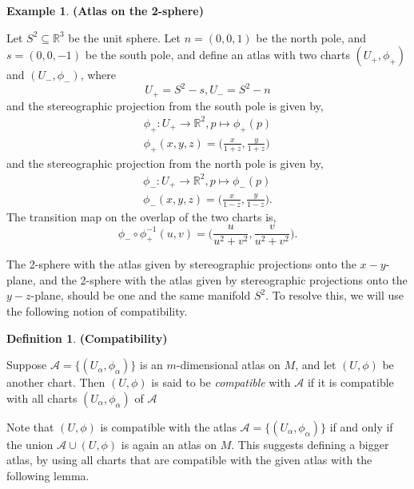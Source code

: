 \documentclass{article}
\theoremstyle{definition}
\newtheorem{defn}[theorem]{Definition}
\newtheorem{example}[theorem]{Example}
\newenvironment{definition}
  {\vspace{8pt}\begin{mdframed}[backgroundcolor=blueish,innertopmargin=4]\begin{defn}}
  {\end{defn}\end{mdframed}\vspace{4pt}}
\begin{document}
\begin{example} \textbf{(Atlas on the 2-sphere)}

Let $S^2 \subseteq \mathbb R^3$ be the unit sphere. Let $n = (0,0,1)$ be the north pole, and $s =(0,0,-1)$ be the south pole, and define an atlas with two charts $(U_+,\phi_+)$ and $(U_-,\phi_-)$, where
\[
U_+ = S^2 - {s}, U_- = S^2 - {n}
\]
and the stereographic projection from the south pole is given by,
\begin{align*}
    \phi_+ : U_+ \rightarrow \mathbb R^2, p \mapsto \phi_+(p)\\
    \phi_+(x, y,z) = \bigg( \frac{x}{1+z},\frac{y}{1+z} \bigg)
\end{align*}
and the stereographic projection from the north pole is given by,
\begin{align*}
    \phi_- : U_+ \rightarrow \mathbb R^2, p \mapsto \phi_-(p)\\
    \phi_-(x, y,z) = \bigg( \frac{x}{1-z},\frac{y}{1-z} \bigg).
\end{align*}
The transition map on the overlap of the two charts is,
\begin{equation*}
    \phi_- \circ \phi_+^{-1} (u,v) =  \bigg( \frac{u}{u^2 + v^2}, \frac{v}{u^2 + v^2} \bigg).
\end{equation*}

\end{example}



The 2-sphere with the atlas given by stereographic projections onto the $x-y$-plane, and the 2-sphere with the atlas given by stereographic projections onto the $y-z$-plane, should be one and the same manifold $S^2$. To resolve this, we will use the following notion of compatibility.

\begin{definition} \textbf{(Compatibility)}

Suppose $\mathscr{A} =  \{(U_\alpha, \phi_\alpha) \}$ is an $m$-dimensional atlas on $M$, and let $(U,\phi)$ be another chart. Then $(U,\phi)$ is said to be \textit{compatible} with $\mathscr{A}$ if it is compatible with all charts $(U_\alpha, \phi_\alpha)$ of $\mathscr{A}$
\end{definition}

Note that  $(U,\phi)$ is compatible with the atlas $\mathscr{A} =  \{(U_\alpha, \phi_\alpha) \}$ if and only if the union $\mathscr{A} \cup {(U,\phi)}$ is again an atlas on $M$. This suggests defining a bigger atlas, by using all charts that are compatible with the given atlas with the following lemma.
\end{document}
